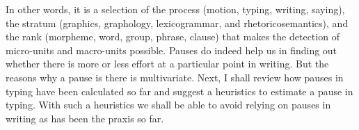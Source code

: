 In other words, it is a selection of the process (motion, typing, writing, saying), the stratum (graphics, graphology, lexicogrammar, and rhetoricosemantics), and the rank (morpheme, word, group, phrase, clause) that makes the detection of micro-units and macro-units possible. Pauses do indeed help us in finding out whether there is more or less effort at a particular point in writing. But the reasons why a pause is there is multivariate. Next, I shall review how pauses in typing have been calculated so far and suggest a heuristics to estimate a pause in typing. With such a heuristics we shall be able to avoid relying on pauses in writing as has been the praxis so far.
